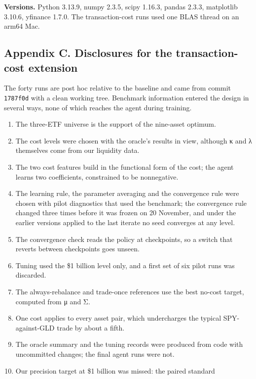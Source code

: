 \documentclass[
  11pt]{article}
\providecommand{\tightlist}{%
  \setlength{\itemsep}{0pt}\setlength{\parskip}{0pt}}
\begin{document}
\textbf{Versions.} Python 3.13.9, numpy 2.3.5, scipy 1.16.3, pandas
2.3.3, matplotlib 3.10.6, yfinance 1.7.0. The transaction-cost runs used
one BLAS thread on an arm64 Mac.

\subsection{Appendix C. Disclosures for the transaction-cost
extension}\label{appendix-c.-disclosures-for-the-transaction-cost-extension}

The forty runs are post hoc relative to the baseline and came from
commit \texttt{1787f0d} with a clean working tree. Benchmark information
entered the design in several ways, none of which reaches the agent
during training.

\begin{enumerate}
\def\labelenumi{\arabic{enumi}.}
\tightlist
\item
  The three-ETF universe is the support of the nine-asset optimum.
\item
  The cost levels were chosen with the oracle's results in view,
  although κ and λ themselves come from our liquidity data.
\item
  The two cost features build in the functional form of the cost; the
  agent learns two coefficients, constrained to be nonnegative.
\item
  The learning rule, the parameter averaging and the convergence rule
  were chosen with pilot diagnostics that used the benchmark; the
  convergence rule changed three times before it was frozen on 20
  November, and under the earlier versions applied to the last iterate
  no seed converges at any level.
\item
  The convergence check reads the policy at checkpoints, so a switch
  that reverts between checkpoints goes unseen.
\item
  Tuning used the \$1 billion level only, and a first set of six pilot
  runs was discarded.
\item
  The always-rebalance and trade-once references use the best no-cost
  target, computed from μ and Σ.
\item
  One cost applies to every asset pair, which undercharges the typical
  SPY-against-GLD trade by about a fifth.
\item
  The oracle summary and the tuning records were produced from code with
  uncommitted changes; the final agent runs were not.
\item
  Our precision target at \$1 billion was missed: the paired standard

\end{enumerate}
\end{document}
